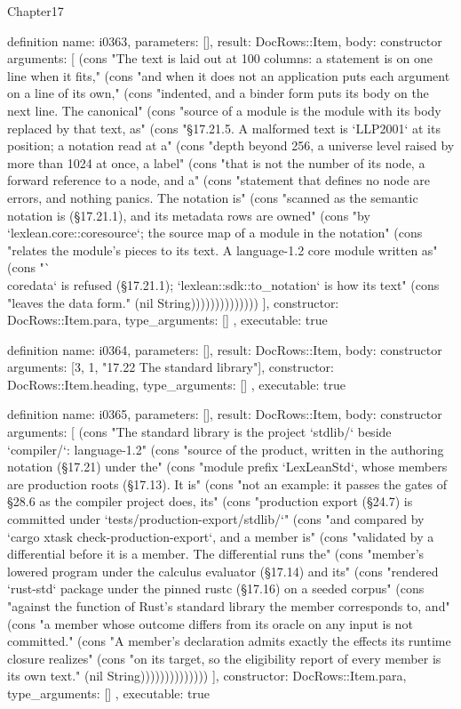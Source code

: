\begin{lexlean}{Chapter17}
\begin{semanticmodule}
definition{
  name: i0363,
  parameters: [],
  result: DocRows::Item,
  body: constructor{
    arguments: [
      (cons "The text is laid out at 100 columns: a statement is on one line when it fits," (cons "and when it does not an application puts each argument on a line of its own," (cons "indented, and a binder form puts its body on the next line. The canonical" (cons "source of a module is the module with its body replaced by that text, as" (cons "§17.21.5. A malformed text is `LLP2001` at its position; a notation read at a" (cons "depth beyond 256, a universe level raised by more than 1024 at once, a label" (cons "that is not the number of its node, a forward reference to a node, and a" (cons "statement that defines no node are errors, and nothing panics. The notation is" (cons "scanned as the semantic notation is (§17.21.1), and its metadata rows are owned" (cons "by `lexlean.core::coresource`; the source map of a module in the notation" (cons "relates the module's pieces to its text. A language-1.2 core module written as" (cons "`\\coredata` is refused (§17.21.1); `lexlean::sdk::to_notation` is how its text" (cons "leaves the data form." (nil String))))))))))))))
    ],
    constructor: DocRows::Item.para,
    type_arguments: []
  },
  executable: true
}

definition{
  name: i0364,
  parameters: [],
  result: DocRows::Item,
  body: constructor{
    arguments: [3, 1, "17.22 The standard library"],
    constructor: DocRows::Item.heading,
    type_arguments: []
  },
  executable: true
}

definition{
  name: i0365,
  parameters: [],
  result: DocRows::Item,
  body: constructor{
    arguments: [
      (cons "The standard library is the project `stdlib/` beside `compiler/`: language-1.2" (cons "source of the product, written in the authoring notation (§17.21) under the" (cons "module prefix `LexLeanStd`, whose members are production roots (§17.13). It is" (cons "not an example: it passes the gates of §28.6 as the compiler project does, its" (cons "production export (§24.7) is committed under `tests/production-export/stdlib/`" (cons "and compared by `cargo xtask check-production-export`, and a member is" (cons "validated by a differential before it is a member. The differential runs the" (cons "member's lowered program under the calculus evaluator (§17.14) and its" (cons "rendered `rust-std` package under the pinned rustc (§17.16) on a seeded corpus" (cons "against the function of Rust's standard library the member corresponds to, and" (cons "a member whose outcome differs from its oracle on any input is not committed." (cons "A member's declaration admits exactly the effects its runtime closure realizes" (cons "on its target, so the eligibility report of every member is its own text." (nil String))))))))))))))
    ],
    constructor: DocRows::Item.para,
    type_arguments: []
  },
  executable: true
}


\end{semanticmodule}
\end{lexlean}
